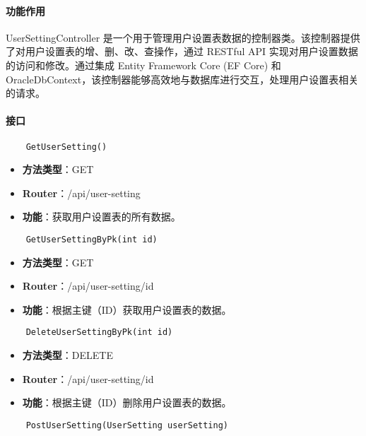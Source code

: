 \paragraph{功能作用}

UserSettingController 是一个用于管理用户设置表数据的控制器类。该控制器提供了对用户设置表的增、删、改、查操作，通过 RESTful API 实现对用户设置数据的访问和修改。通过集成 Entity Framework Core (EF Core) 和 OracleDbContext，该控制器能够高效地与数据库进行交互，处理用户设置表相关的请求。

\paragraph{接口}

\begin{verbatim}
	GetUserSetting()
\end{verbatim}

\begin{itemize}
	\item \textbf{方法类型}：GET
	\item \textbf{Router}：/api/user-setting
	\item \textbf{功能}：获取用户设置表的所有数据。
\end{itemize}

\begin{verbatim}
	GetUserSettingByPk(int id)
\end{verbatim}

\begin{itemize}
	\item \textbf{方法类型}：GET
	\item \textbf{Router}：/api/user-setting/{id}
	\item \textbf{功能}：根据主键（ID）获取用户设置表的数据。
\end{itemize}

\begin{verbatim}
	DeleteUserSettingByPk(int id)
\end{verbatim}

\begin{itemize}
	\item \textbf{方法类型}：DELETE
	\item \textbf{Router}：/api/user-setting/{id}
	\item \textbf{功能}：根据主键（ID）删除用户设置表的数据。
\end{itemize}

\begin{verbatim}
	PostUserSetting(UserSetting userSetting)
\end{verbatim}

